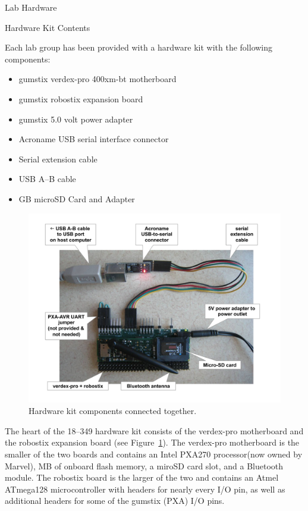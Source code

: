 \documentclass{article}
\begin{document}
	\begin{section}{Lab Hardware}
	\begin{subsection}{Hardware Kit Contents}
			
	Each lab group has been provided with a hardware kit with the
	following components:

	\begin{itemize}
		\item gumstix verdex-pro 400xm-bt motherboard
		\item gumstix robostix expansion board
		\item gumstix 5.0 volt power adapter
		\item Acroname USB serial interface connector
		\item Serial extension cable
		\item USB A--B cable
		\item \unit[2]{GB} microSD Card and Adapter
	\end{itemize}

	\begin{figure}[t]
		\centering
		\includegraphics[width=\textwidth]{hardware-new}					\caption{Hardware kit components connected together.}
		\label{hardware}
	\end{figure}

	The heart of the 18--349 hardware kit consists of the verdex-pro
	motherboard and the robostix expansion board (see
	Figure~\ref{hardware}).  The verdex-pro motherboard is the smaller
	of the two boards and contains an Intel PXA270 processor(now
	owned by Marvel),
	\unit[16]{MB} of onboard flash memory, a miroSD card slot, and
	a Bluetooth module.  The robostix board is the larger of the
	two and contains an Atmel ATmega128 microcontroller with
	headers for nearly every I/O pin, as well as additional
	headers for some of the gumstix (PXA) I/O pins.


\end{subsection}
\end{section}
\end{document}
